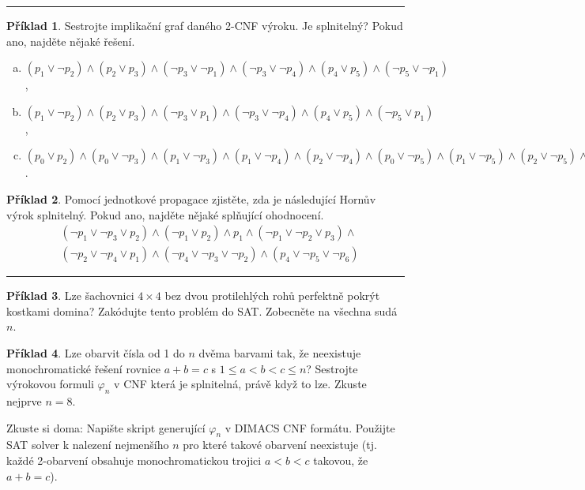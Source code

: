 \documentclass{amsart}
\theoremstyle{definition}
\newtheorem{problem}{Příklad}
\begin{document}
\hrule


\bigskip\begin{problem} Sestrojte implikační graf daného 2-CNF výroku. Je splnitelný? Pokud ano, najděte nějaké řešení.
\begin{enumerate}[a)]
\item $(p_1\vee \neg p_2)\wedge (p_2\vee p_3)\wedge (\neg p_3\vee \neg p_1)\wedge (\neg p_3\vee \neg p_4)\wedge (p_4\vee p_5)\wedge (\neg p_5\vee \neg p_1)$,
\item $(p_1\vee \neg p_2)\wedge (p_2\vee p_3)\wedge (\neg p_3\vee p_1)\wedge (\neg p_3\vee \neg p_4)\wedge (p_4\vee p_5)\wedge (\neg p_5\vee p_1)$,
\item $(p_0 \vee  p_2) \wedge  (p_0 \vee  \neg p_3) \wedge  (p_1 \vee  \neg p_3) 
\wedge  (p_1 \vee  \neg p_4) \wedge  (p_2 \vee  \neg p_4) 
\wedge  (p_0 \vee  \neg p_5)
\wedge 
(p_1 \vee  \neg p_5) \wedge  (p_2 \vee  \neg p_5) \wedge  (\neg p_1 \vee  \neg p_6) \wedge  (p_4 \vee  p_6) \wedge  (p_5 \vee  p_6) \wedge  p_1\wedge \neg p_7$.
\end{enumerate}
\end{problem}

\begin{problem}
Pomocí jednotkové propagace zjistěte, zda je následující Hornův výrok splnitelný. Pokud ano, najděte nějaké splňující ohodnocení.
\begin{align*}
&(\neg p_1 \vee \neg p_3 \vee p_2)\wedge(\neg p_1 \vee p_2)\wedge p_1 \wedge (\neg p_1 \vee \neg p_2 \vee p_3)\wedge \\
&(\neg p_2 \vee \neg p_4 \vee p_1)\wedge(\neg p_4 \vee \neg p_3 \vee \neg p_2)\wedge(p_4\vee \neg p_5 \vee\neg p_6)
\end{align*}
\end{problem}


\hrule


\begin{problem}
Lze šachovnici $4\times 4$ bez dvou protilehlých rohů perfektně pokrýt kostkami domina? Zakódujte tento problém do SAT. Zobecněte na všechna sudá~$n$.
\end{problem}


\begin{problem}
Lze obarvit čísla od 1 do $n$ dvěma barvami tak, že neexistuje monochromatické řešení rovnice
$a+b=c$ s $1\leq a<b<c\leq n$? Sestrojte výrokovou formuli $\varphi_n$ v CNF která je splnitelná, právě když to lze. Zkuste nejprve $n=8$.

Zkuste si doma: Napište skript generující $\varphi_n$ v DIMACS CNF formátu. Použijte SAT solver k nalezení nejmenšího $n$ pro které takové obarvení neexistuje (tj. každé 2-obarvení obsahuje monochromatickou trojici $a<b<c$ takovou, že $a+b=c$).
\end{problem}
\end{document}
